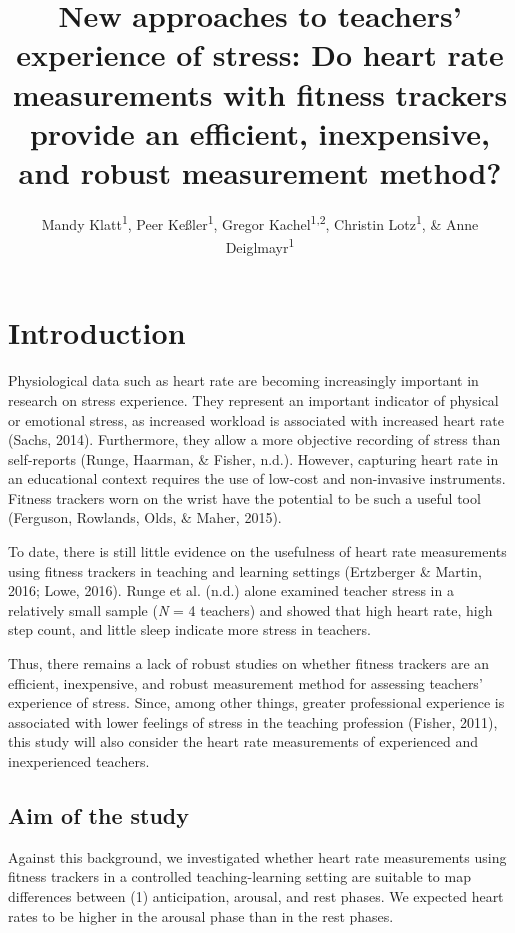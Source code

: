 \documentclass[
  man]{apa6}
\title{New approaches to teachers' experience of stress: Do heart rate measurements with fitness trackers provide an efficient, inexpensive, and robust measurement method?}
\author{Mandy Klatt\textsuperscript{1}, Peer Keßler\textsuperscript{1}, Gregor Kachel\textsuperscript{1,2}, Christin Lotz\textsuperscript{1}, \& Anne Deiglmayr\textsuperscript{1}}
\date{}
\affiliation{\vspace{0.5cm}\textsuperscript{1} Leipzig University\\\textsuperscript{2} Max Planck Institute for Evolutionary Anthropology}
\begin{document}
\maketitle

\hypertarget{introduction}{%
\section{Introduction}\label{introduction}}

Physiological data such as heart rate are becoming increasingly important in research on stress experience. They represent an important indicator of physical or emotional stress, as increased workload is associated with increased heart rate (Sachs, 2014). Furthermore, they allow a more objective recording of stress than self-reports (Runge, Haarman, \& Fisher, n.d.). However, capturing heart rate in an educational context requires the use of low-cost and non-invasive instruments. Fitness trackers worn on the wrist have the potential to be such a useful tool (Ferguson, Rowlands, Olds, \& Maher, 2015).

To date, there is still little evidence on the usefulness of heart rate measurements using fitness trackers in teaching and learning settings (Ertzberger \& Martin, 2016; Lowe, 2016). Runge et al. (n.d.) alone examined teacher stress in a relatively small sample (\emph{N} = 4 teachers) and showed that high heart rate, high step count, and little sleep indicate more stress in teachers.

Thus, there remains a lack of robust studies on whether fitness trackers are an efficient, inexpensive, and robust measurement method for assessing teachers' experience of stress. Since, among other things, greater professional experience is associated with lower feelings of stress in the teaching profession (Fisher, 2011), this study will also consider the heart rate measurements of experienced and inexperienced teachers.

\hypertarget{aim-of-the-study}{%
\subsection{Aim of the study}\label{aim-of-the-study}}

Against this background, we investigated whether heart rate measurements using fitness trackers in a controlled teaching-learning setting are suitable to map differences between (1) anticipation, arousal, and rest phases. We expected heart rates to be higher in the arousal phase than in the rest phases.
\end{document}
